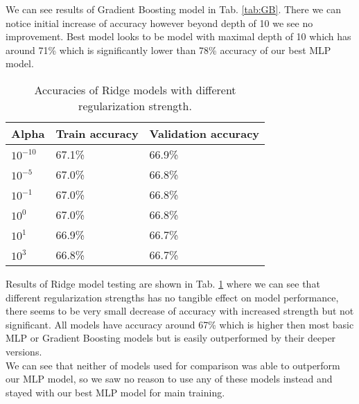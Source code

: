 We can see results of Gradient Boosting model in Tab. \ref{tab:GB}. There we can notice initial increase of accuracy however beyond depth of 10 we see no improvement. Best model looks to be model with maximal depth of 10 which has around 71\% which is significantly lower than 78\% accuracy of our best MLP model.
\\

\begin{table}[!h]
	\centering
	\begin{tabular}{|l|l|l|}
		\hline
		Alpha      & Train accuracy & Validation accuracy \\ \hline
		$10^{-10}$ & 67.1\%         & 66.9\%              \\ \hline
		$10^{-5}$  & 67.0\%         & 66.8\%              \\ \hline
		$10^{-1}$  & 67.0\%         & 66.8\%              \\ \hline
		$10^{0}$   & 67.0\%         & 66.8\%              \\ \hline
		$10^{1}$   & 66.9\%         & 66.7\%              \\ \hline
		$10^{3}$   & 66.8\%         & 66.7\%              \\ \hline
	\end{tabular}
	\caption{Accuracies of Ridge models with different regularization strength.}
	\label{tab:Ridge}
\end{table}

Results of Ridge model testing are shown in Tab. \ref{tab:Ridge} where we can see that different regularization strengths has no tangible effect on model performance, there seems to be very small decrease of accuracy with increased strength but not significant. All models have accuracy around 67\% which is higher then most basic MLP or Gradient Boosting models but is easily outperformed by their deeper versions.
\\

We can see that neither of models used for comparison was able to outperform our MLP model, so we saw no reason to use any of these models instead and stayed with our best MLP model for main training.
